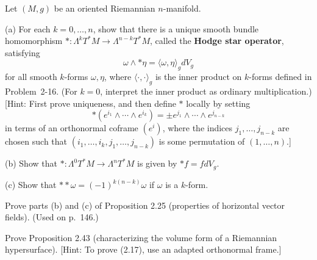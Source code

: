 \begin{exercise}\label{prob:hodge-star-operator}


Let $(M,g)$ be an oriented Riemannian $n$-manifold.

(a) For each $k = 0, \ldots, n$, show that there is a unique smooth bundle homomorphism $*: \Lambda^k T^* M \to \Lambda^{n-k}T^*M$, called the \textbf{Hodge star operator}, satisfying
\[
\omega \wedge *\eta = \langle\omega,\eta\rangle_g dV_g
\]
for all smooth $k$-forms $\omega, \eta$, where $\langle\cdot,\cdot\rangle_g$ is the inner product on $k$-forms defined in Problem~2-16. (For $k = 0$, interpret the inner product as ordinary multiplication.) [Hint: First prove uniqueness, and then define $*$ locally by setting
\[
*(e^{i_1} \wedge \cdots \wedge e^{i_k}) = \pm e^{j_1} \wedge \cdots \wedge e^{j_{n-k}}
\]
in terms of an orthonormal coframe $(e^i)$, where the indices $j_1,\ldots,j_{n-k}$ are chosen such that $(i_1,\ldots,i_k,j_1,\ldots,j_{n-k})$ is some permutation of $(1,\ldots,n)$.]

(b) Show that $*: \Lambda^0 T^*M \to \Lambda^n T^*M$ is given by $*f = f dV_g$.

(c) Show that $* * \omega = (-1)^{k(n-k)}\omega$ if $\omega$ is a $k$-form.
\end{exercise}

\begin{exercise}\label{prob:horizontal-vector-fields}


Prove parts (b) and (c) of Proposition 2.25 (properties of horizontal vector fields). (Used on p.~146.)
\end{exercise}

\begin{exercise}
\label{prob:hypersurface-volume-form}


Prove Proposition 2.43 (characterizing the volume form of a Riemannian hypersurface). [Hint: To prove (2.17), use an adapted orthonormal frame.]
\end{exercise}

